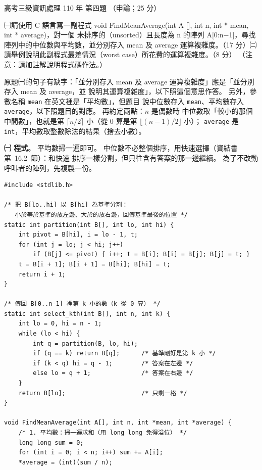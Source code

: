 \begin{pastexam}[label={px:gk3-110-ds-04}]{高考三級資訊處理 110 年 第四題}
（申論；25 分）

㈠請使用 C 語言寫一副程式 void FindMeanAverage(int A [], int n, int * mean, int * average)，對一個
未排序的（unsorted）且長度為 n 的陣列 A[0:n$-$1]，尋找陣列中的中位數與平均數，並分別存入 mean 及
average 運算複雜度。（17 分）㈡請舉例說明此副程式最差情況（worst case）所花費的運算複雜度。（8 分）
（注意：請加註解說明程式碼作法。）
\end{pastexam}

\begin{pastsoln}
原題㈠的句子有缺字：「並分別存入 mean 及 average 運算複雜度」應是「並分別存入 mean 及 average，並
說明其運算複雜度」，以下照這個意思作答。 另外，參數名稱 \texttt{mean} 在英文裡是「平均數」，但題目
說中位數存入 \texttt{mean}、平均數存入 \texttt{average}，以下照題目的對應。 再約定兩點：$n$ 是偶數時
中位數取「較小的那個中間數」，也就是第 $\lceil n/2 \rceil$ 小（從 $0$ 算是第 $\lfloor (n-1)/2 \rfloor$ 小）；
\texttt{average} 是 \texttt{int}，平均數取整數除法的結果（捨去小數）。

\textbf{㈠ 程式}。 平均數掃一遍即可。 中位數不必整個排序，用快速選擇（資結書第~16.2~節）：和快速
排序一樣分割，但只往含有答案的那一邊繼續。 為了不改動呼叫者的陣列，先複製一份。
\begin{verbatim}
#include <stdlib.h>

/* 把 B[lo..hi] 以 B[hi] 為基準分割：
   小於等於基準的放左邊、大於的放右邊，回傳基準最後的位置 */
static int partition(int B[], int lo, int hi) {
    int pivot = B[hi], i = lo - 1, t;
    for (int j = lo; j < hi; j++)
        if (B[j] <= pivot) { i++; t = B[i]; B[i] = B[j]; B[j] = t; }
    t = B[i + 1]; B[i + 1] = B[hi]; B[hi] = t;
    return i + 1;
}

/* 傳回 B[0..n-1] 裡第 k 小的數（k 從 0 算） */
static int select_kth(int B[], int n, int k) {
    int lo = 0, hi = n - 1;
    while (lo < hi) {
        int q = partition(B, lo, hi);
        if (q == k) return B[q];      /* 基準剛好是第 k 小 */
        if (k < q) hi = q - 1;        /* 答案在左邊 */
        else lo = q + 1;              /* 答案在右邊 */
    }
    return B[lo];                     /* 只剩一格 */
}

void FindMeanAverage(int A[], int n, int *mean, int *average) {
    /* 1. 平均數：掃一遍求和（用 long long 免得溢位） */
    long long sum = 0;
    for (int i = 0; i < n; i++) sum += A[i];
    *average = (int)(sum / n);


\end{verbatim}
\end{pastsoln}
